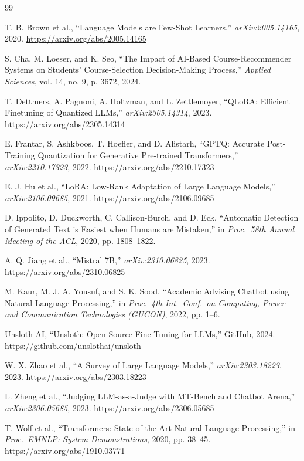 \documentclass[11pt, a4paper]{article}
\begin{document}
\begin{thebibliography}{99}

T. B. Brown et al., ``Language Models are Few-Shot Learners,'' \textit{arXiv:2005.14165}, 2020. \url{https://arxiv.org/abs/2005.14165}

S. Cha, M. Loeser, and K. Seo, ``The Impact of AI-Based Course-Recommender Systems on Students' Course-Selection Decision-Making Process,'' \textit{Applied Sciences}, vol. 14, no. 9, p. 3672, 2024.

T. Dettmers, A. Pagnoni, A. Holtzman, and L. Zettlemoyer, ``QLoRA: Efficient Finetuning of Quantized LLMs,'' \textit{arXiv:2305.14314}, 2023. \url{https://arxiv.org/abs/2305.14314}

E. Frantar, S. Ashkboos, T. Hoefler, and D. Alistarh, ``GPTQ: Accurate Post-Training Quantization for Generative Pre-trained Transformers,'' \textit{arXiv:2210.17323}, 2022. \url{https://arxiv.org/abs/2210.17323}

E. J. Hu et al., ``LoRA: Low-Rank Adaptation of Large Language Models,'' \textit{arXiv:2106.09685}, 2021. \url{https://arxiv.org/abs/2106.09685}

D. Ippolito, D. Duckworth, C. Callison-Burch, and D. Eck, ``Automatic Detection of Generated Text is Easiest when Humans are Mistaken,'' in \textit{Proc.\ 58th Annual Meeting of the ACL}, 2020, pp. 1808--1822.

A. Q. Jiang et al., ``Mistral 7B,'' \textit{arXiv:2310.06825}, 2023. \url{https://arxiv.org/abs/2310.06825}

M. Kaur, M. J. A. Yousuf, and S. K. Sood, ``Academic Advising Chatbot using Natural Language Processing,'' in \textit{Proc.\ 4th Int.\ Conf.\ on Computing, Power and Communication Technologies (GUCON)}, 2022, pp. 1--6.

Unsloth AI, ``Unsloth: Open Source Fine-Tuning for LLMs,'' GitHub, 2024. \url{https://github.com/unslothai/unsloth}

W. X. Zhao et al., ``A Survey of Large Language Models,'' \textit{arXiv:2303.18223}, 2023. \url{https://arxiv.org/abs/2303.18223}

L. Zheng et al., ``Judging LLM-as-a-Judge with MT-Bench and Chatbot Arena,'' \textit{arXiv:2306.05685}, 2023. \url{https://arxiv.org/abs/2306.05685}

T. Wolf et al., ``Transformers: State-of-the-Art Natural Language Processing,'' in \textit{Proc.\ EMNLP: System Demonstrations}, 2020, pp. 38--45. \url{https://arxiv.org/abs/1910.03771}


\end{thebibliography}
\end{document}
